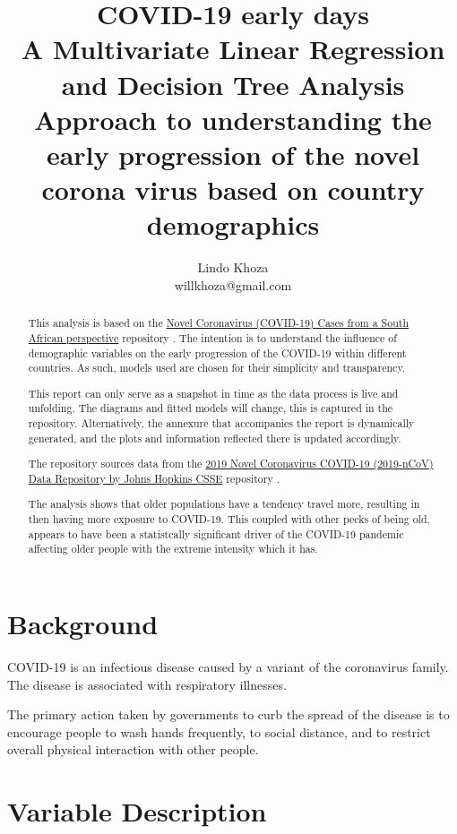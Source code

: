 \documentclass[]{report}
\title{COVID-19 early days \\ \large A Multivariate Linear Regression and Decision Tree Analysis \\ Approach to understanding the early progression of the novel corona virus based on country demographics}
\author{Lindo Khoza \\ willkhoza@gmail.com}
\begin{document}
\maketitle

\begin{abstract}
This analysis is based on the \href{https://github.com/willkhoza/COVID_SA}{Novel Coronavirus (COVID-19) Cases from a South African perspective} repository \cite{covidsa}. The intention is to understand the influence of demographic variables on the early progression of the COVID-19 within different countries. As such, models used are chosen for their simplicity and transparency.

This report can only serve as a snapshot in time as the data process is live and unfolding. The diagrams and fitted models will change, this is captured in the repository. Alternatively, the annexure that accompanies the report is dynamically generated, and the plots and information reflected there is updated accordingly.

The repository sources data from the \href{https://github.com/CSSEGISandData/COVID-19}{2019 Novel Coronavirus COVID-19 (2019-nCoV) Data Repository by Johns Hopkins CSSE} repository \cite{jhu}.

The analysis shows that older populations have a tendency travel more, resulting in then having more exposure to COVID-19. This coupled with other pecks of being old, appears to have been a statistcally significant driver of the COVID-19 pandemic affecting older people with the extreme intensity which it has.

\end{abstract}

\section*{Background}

COVID-19 is an infectious disease caused by a variant of the coronavirus family. The disease is associated with respiratory illnesses.

The primary action taken by governments to curb the spread of the disease is to encourage people to wash hands frequently, to social distance, and to restrict overall physical interaction with other people.

\section{Variable Description}
\end{document}
